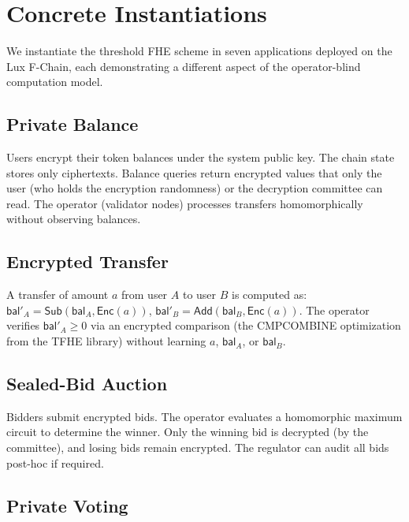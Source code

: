 \section{Concrete Instantiations}

\label{sec:demos}

We instantiate the threshold FHE scheme in seven applications deployed
on the Lux F-Chain, each demonstrating a different aspect of the
operator-blind computation model.

\subsection{Private Balance}

Users encrypt their token balances under the system public key.  The
chain state stores only ciphertexts.  Balance queries return encrypted
values that only the user (who holds the encryption randomness) or the
decryption committee can read.  The operator (validator nodes) processes
transfers homomorphically without observing balances.

\subsection{Encrypted Transfer}

A transfer of amount $a$ from user $A$ to user $B$ is computed as:
$\mathsf{bal}'_A = \mathsf{Sub}(\mathsf{bal}_A, \mathsf{Enc}(a))$,
$\mathsf{bal}'_B = \mathsf{Add}(\mathsf{bal}_B, \mathsf{Enc}(a))$.
The operator verifies $\mathsf{bal}'_A \geq 0$ via an encrypted
comparison (the CMPCOMBINE optimization from the TFHE library) without
learning $a$, $\mathsf{bal}_A$, or $\mathsf{bal}_B$.

\subsection{Sealed-Bid Auction}

Bidders submit encrypted bids.  The operator evaluates a homomorphic
maximum circuit to determine the winner.  Only the winning bid is
decrypted (by the committee), and losing bids remain encrypted.
The regulator can audit all bids post-hoc if required.

\subsection{Private Voting}

